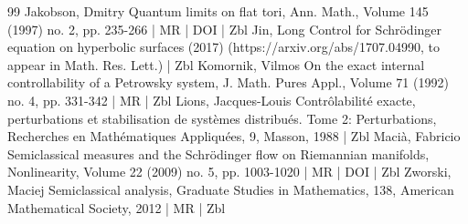 \begin{thebibliography}{99}
Jakobson, Dmitry Quantum limits on flat tori, Ann. Math., Volume 145 (1997) no. 2, pp. 235-266 | MR | DOI | Zbl
Jin, Long Control for Schrödinger equation on hyperbolic surfaces (2017) (https://arxiv.org/abs/1707.04990, to appear in Math. Res. Lett.) | Zbl
Komornik, Vilmos On the exact internal controllability of a Petrowsky system, J. Math. Pures Appl., Volume 71 (1992) no. 4, pp. 331-342 | MR | Zbl
Lions, Jacques-Louis Contrôlabilité exacte, perturbations et stabilisation de systèmes distribués. Tome 2: Perturbations, Recherches en Mathématiques Appliquées, 9, Masson, 1988 | Zbl
Macià, Fabricio Semiclassical measures and the Schrödinger flow on Riemannian manifolds, Nonlinearity, Volume 22 (2009) no. 5, pp. 1003-1020 | MR | DOI | Zbl
Zworski, Maciej Semiclassical analysis, Graduate Studies in Mathematics, 138, American Mathematical Society, 2012 | MR | Zbl
\end{thebibliography}

